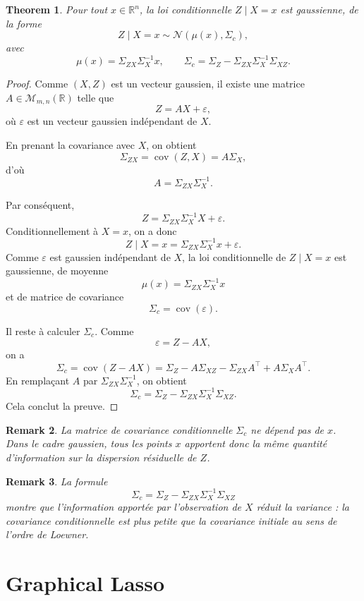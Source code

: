 \documentclass[10pt]{article}
\newtheorem{thm}{Theorem}[section]
\newtheorem{rem}[thm]{Remark}
\newcommand{\R}{\mathbb{R}}
\DeclareMathOperator{\cov}{cov}
\begin{document}
\begin{thm}
	Pour tout $x\in\R^n$, la loi conditionnelle $Z\mid X=x$ est gaussienne, de la forme
	\[
		Z\mid X=x \sim \mathcal N(\mu(x),\Sigma_c),
	\]
	avec
	\[
		\mu(x)=\Sigma_{ZX}\Sigma_X^{-1}x,
		\qquad
		\Sigma_c=\Sigma_Z-\Sigma_{ZX}\Sigma_X^{-1}\Sigma_{XZ}.
	\]
\end{thm}

\begin{proof}
	Comme $(X,Z)$ est un vecteur gaussien, il existe une matrice $A\in \mathcal M_{m,n}(\R)$ telle que
	\[
		Z=AX+\varepsilon,
	\]
	où $\varepsilon$ est un vecteur gaussien indépendant de $X$.

	En prenant la covariance avec $X$, on obtient
	\[
		\Sigma_{ZX}=\cov(Z,X)=A\Sigma_X,
	\]
	d'où
	\[
		A=\Sigma_{ZX}\Sigma_X^{-1}.
	\]

	Par conséquent,
	\[
		Z=\Sigma_{ZX}\Sigma_X^{-1}X+\varepsilon.
	\]
	Conditionnellement à $X=x$, on a donc
	\[
		Z\mid X=x = \Sigma_{ZX}\Sigma_X^{-1}x+\varepsilon.
	\]
	Comme $\varepsilon$ est gaussien indépendant de $X$, la loi conditionnelle de $Z\mid X=x$ est gaussienne, de moyenne
	\[
		\mu(x)=\Sigma_{ZX}\Sigma_X^{-1}x
	\]
	et de matrice de covariance
	\[
		\Sigma_c=\cov(\varepsilon).
	\]

	Il reste à calculer $\Sigma_c$. Comme
	\[
		\varepsilon = Z-AX,
	\]
	on a
	\[
		\Sigma_c
		=
		\cov(Z-AX)
		=
		\Sigma_Z-A\Sigma_{XZ}-\Sigma_{ZX}A^\top + A\Sigma_XA^\top.
	\]
	En remplaçant $A$ par $\Sigma_{ZX}\Sigma_X^{-1}$, on obtient
	\[
		\Sigma_c
		=
		\Sigma_Z-\Sigma_{ZX}\Sigma_X^{-1}\Sigma_{XZ}.
	\]
	Cela conclut la preuve.
\end{proof}

\begin{rem}
	La matrice de covariance conditionnelle $\Sigma_c$ ne dépend pas de $x$. Dans le cadre gaussien, tous les points $x$ apportent donc la même quantité d'information sur la dispersion résiduelle de $Z$.
\end{rem}

\begin{rem}
	La formule
	\[
		\Sigma_c=\Sigma_Z-\Sigma_{ZX}\Sigma_X^{-1}\Sigma_{XZ}
	\]
	montre que l'information apportée par l'observation de $X$ réduit la variance : la covariance conditionnelle est plus petite que la covariance initiale au sens de l'ordre de Loewner.
\end{rem}

\section{Graphical Lasso}
\end{document}
